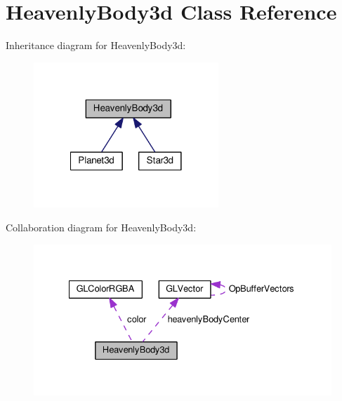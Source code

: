 \section{\-Heavenly\-Body3d \-Class \-Reference}
\label{db/d73/classHeavenlyBody3d}


\-Inheritance diagram for \-Heavenly\-Body3d\-:\nopagebreak
\begin{figure}[H]
\begin{center}
\leavevmode
\includegraphics[width=197pt]{dc/dc8/classHeavenlyBody3d__inherit__graph}
\end{center}
\end{figure}


\-Collaboration diagram for \-Heavenly\-Body3d\-:\nopagebreak
\begin{figure}[H]
\begin{center}
\leavevmode
\includegraphics[width=331pt]{d0/d69/classHeavenlyBody3d__coll__graph}
\end{center}
\end{figure}
